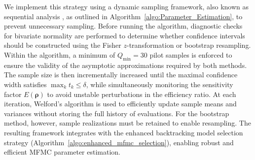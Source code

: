 We implement this strategy using a dynamic sampling framework, also known as sequential analysis \cite{La:2001,Wa:1947}, as outlined in Algorithm~\ref{algo:Parameter_Estimation}, to prevent unnecessary sampling. Before running the algorithm, diagnostic checks for bivariate normality are performed to determine whether confidence intervals should be constructed using the Fisher $z$-transformation or bootstrap resampling. Within the algorithm, a minimum of $Q_{\min} = 30$ pilot samples is enforced to ensure the validity of the asymptotic approximations required by both methods. The sample size is then incrementally increased until the maximal confidence width satisfies $\max_k t_k \leq \delta$, while simultaneously monitoring the sensitivity factor $E(\boldsymbol{\rho})$ to avoid unstable perturbations in the efficiency ratio. At each iteration, Welford’s algorithm is used to efficiently update sample means and variances without storing the full history of evaluations. For the bootstrap method, however, sample realizations must be retained to enable resampling. The resulting framework integrates with the enhanced backtracking model selection strategy (Algorithm~\ref{algo:enhanced_mfmc_selection}), enabling robust and efficient MFMC parameter estimation.


